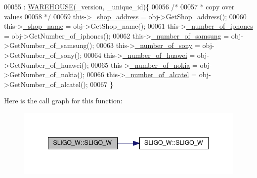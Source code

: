 \begin{DoxyCode}
00055                                                                        : 
      \hyperlink{class_w_a_r_e_h_o_u_s_e_a7a924d389af91f54ed0e1d1d8d56ec57_a7a924d389af91f54ed0e1d1d8d56ec57}{WAREHOUSE}(\_version, \_unique\_id)\{
00056         \textcolor{comment}{/*}
00057 \textcolor{comment}{         * copy over values
}
00058 \textcolor{comment}{         */}
00059         this->\hyperlink{class_s_l_i_g_o___w_ade08b79101c67997dde54515f2088b9d_ade08b79101c67997dde54515f2088b9d}{\_shop\_address} = obj->GetShop\_address();
00060         this->\hyperlink{class_s_l_i_g_o___w_a01bebef43ff4b4d9d728489f05b94d86_a01bebef43ff4b4d9d728489f05b94d86}{\_shop\_name} = obj->GetShop\_name();
00061         this->\hyperlink{class_s_l_i_g_o___w_aa958eed564796bb349d15bf2b2e3208d_aa958eed564796bb349d15bf2b2e3208d}{\_number\_of\_iphones} = obj->GetNumber\_of\_iphones();
00062         this->\hyperlink{class_s_l_i_g_o___w_a2c7845560ec14452132d659eb54f2cec_a2c7845560ec14452132d659eb54f2cec}{\_number\_of\_samsung} = obj->GetNumber\_of\_samsung();
00063         this->\hyperlink{class_s_l_i_g_o___w_a0ccf87fe78352e1eac98ed3c85810caa_a0ccf87fe78352e1eac98ed3c85810caa}{\_number\_of\_sony} = obj->GetNumber\_of\_sony();
00064         this->\hyperlink{class_s_l_i_g_o___w_af9ca2fb509b7b8ca9f1860ece827501f_af9ca2fb509b7b8ca9f1860ece827501f}{\_number\_of\_huawei} = obj->GetNumber\_of\_huawei();
00065         this->\hyperlink{class_s_l_i_g_o___w_a9fe78b9365c145432d58cb947b01111a_a9fe78b9365c145432d58cb947b01111a}{\_number\_of\_nokia} = obj->GetNumber\_of\_nokia();
00066         this->\hyperlink{class_s_l_i_g_o___w_acbf32331901a3fc710c5c97d286b6fcf_acbf32331901a3fc710c5c97d286b6fcf}{\_number\_of\_alcatel} = obj->GetNumber\_of\_alcatel();
00067     \}
\end{DoxyCode}


Here is the call graph for this function\+:\nopagebreak
\begin{figure}[H]
\begin{center}
\leavevmode
\includegraphics[width=342pt]{class_s_l_i_g_o___w_a5a969bbfbb08f8a5d29f766288f2f7e6_a5a969bbfbb08f8a5d29f766288f2f7e6_cgraph}
\end{center}
\end{figure}


